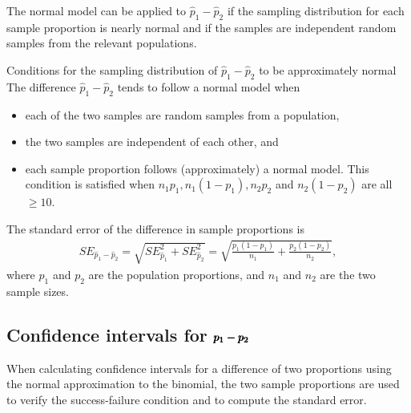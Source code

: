 The normal model can be applied to $\hat{p}_1 - \hat{p}_2$ if the sampling distribution for each sample proportion is nearly normal and if the samples are independent random samples from the relevant populations. 

\begin{onebox}{Conditions for the sampling distribution of $\hat{p}_1 - \hat{p}_2$ to be approximately normal}
The difference $\hat{p}_1 - \hat{p}_2$ tends to follow a normal model when
\begin{itemize}
\setlength{\itemsep}{0mm}
\item each of the two samples are random samples from a population,
\item the two samples are independent of each other, and
\item each sample proportion follows (approximately) a normal model. This condition is satisfied when $n_1p_1, n_1(1 - p_1), n_2 p_2$ and $n_2(1 - p_2)$ are all $\geq 10$.
\end{itemize}
The standard error of the difference in sample proportions is
\begin{eqnarray}
SE_{\hat{p}_1 - \hat{p}_2}
	= \sqrt{SE_{\hat{p}_1}^2 + SE_{\hat{p}_2}^2}
	= \sqrt{\frac{p_1(1-p_1)}{n_1} + \frac{p_2(1-p_2)}{n_2}},
\label{seForDiffOfProp}
\end{eqnarray}
where $p_1$ and $p_2$ are the population proportions, and $n_1$ and $n_2$ are the two sample sizes.
\end{onebox}


\textD{\newpage}


\subsection{Confidence intervals for $\pmb{\MakeLowercase{p_1 - p_2}}$}
\label{confidenceIntervalsDifferenceProportions}

When calculating confidence intervals for a difference of two proportions using the normal approximation to the binomial, the two sample proportions are used to verify the success-failure condition and to compute the standard error.

